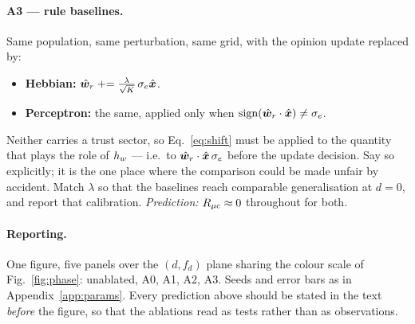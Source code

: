 \paragraph{A3 --- rule baselines.} Same population, same perturbation, same grid,
with the opinion update replaced by:
\begin{itemize}
  \item \textbf{Hebbian:} $\hat{\bm{w}}_r \mathrel{+}= \tfrac{\lambda}{\sqrt{K}}\,\sigma_e \hat{\bm{x}}$.
  \item \textbf{Perceptron:} the same, applied only when
    $\mathrm{sign}(\hat{\bm{w}}_r\cdot\hat{\bm{x}}) \neq \sigma_e$.
\end{itemize}
Neither carries a trust sector, so Eq.~\ref{eq:shift} must be applied to the
quantity that plays the role of $h_{w}$ --- i.e.\ to $\hat{\bm{w}}_r \cdot \hat{\bm{x}}\,\sigma_e$
before the update decision. Say so explicitly; it is the one place where the
comparison could be made unfair by accident. Match $\lambda$ so that the baselines
reach comparable generalisation at $d = 0$, and report that calibration.
\emph{Prediction:} $R_{\mu c} \approx 0$ throughout for both.

\paragraph{Reporting.} One figure, five panels over the $(d, f_d)$ plane sharing
the colour scale of Fig.~\ref{fig:phase}: unablated, A0, A1, A2, A3. Seeds and
error bars as in Appendix~\ref{app:params}. Every prediction above should be stated
in the text \emph{before} the figure, so that the ablations read as tests rather
than as observations.
